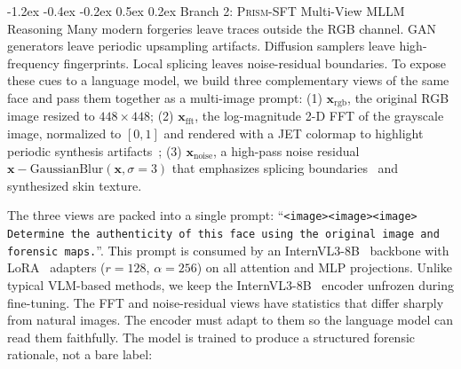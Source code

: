 \documentclass[10pt,twocolumn,letterpaper]{article}
\makeatletter
\renewcommand\subsection{\@startsection{subsection}{2}{\z@}%
  {-1.2ex \@plus -0.4ex \@minus -0.2ex}%
  {0.5ex \@plus 0.2ex}%
  {\normalfont\normalsize\bfseries}}
\newcommand{\prism}{\textsc{Prism-SFT}}
\makeatother
\begin{document}
\subsection{Branch 2: \prism{}  Multi-View MLLM Reasoning}
\label{sec:prism}
{Many modern forgeries leave traces outside the RGB channel. GAN generators leave periodic upsampling artifacts. Diffusion samplers leave high-frequency fingerprints. Local splicing leaves noise-residual boundaries.} To expose these cues to a language model, we build three complementary views of the same face and pass them together as a multi-image prompt: (1) $\mathbf{x}_{\text{rgb}}$, the original RGB image resized to $448{\times}448$; (2) $\mathbf{x}_{\text{fft}}$, the log-magnitude 2-D FFT of the grayscale image, normalized to $[0,1]$ and rendered with a JET colormap to highlight periodic synthesis artifacts~\cite{f3net,freqblender}; (3) $\mathbf{x}_{\text{noise}}$, a high-pass noise residual $\mathbf{x} - \mathrm{GaussianBlur}(\mathbf{x},\sigma{=}3)$ that emphasizes splicing boundaries~\cite{srm} and synthesized skin texture.
\par The three views are packed into a single prompt: ``\texttt{<image><image><image> Determine the authenticity of this face using the original image and forensic maps.}''. This prompt is consumed by an InternVL3-8B~\cite{internvl3} backbone with LoRA~\cite{lora} adapters ($r{=}128$, $\alpha{=}256$) on all attention and MLP projections. Unlike typical VLM-based methods, we keep the InternVL3-8B~\cite{internvl3} encoder unfrozen during fine-tuning. The FFT and noise-residual views have statistics that differ sharply from natural images. The encoder must adapt to them so the language model can read them faithfully. The model is trained to produce a structured forensic rationale, not a bare label:
\end{document}

